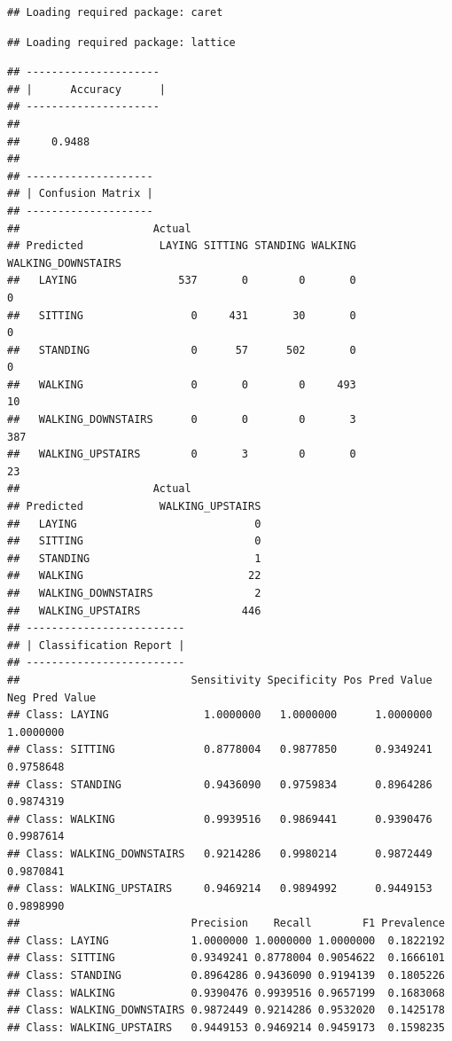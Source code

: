 \documentclass[
]{article}
\begin{document}
\begin{verbatim}
## Loading required package: caret
\end{verbatim}

\begin{verbatim}
## Loading required package: lattice
\end{verbatim}

\begin{verbatim}
## ---------------------
## |      Accuracy      |
## ---------------------
## 
##     0.9488
## 
## --------------------
## | Confusion Matrix |
## --------------------
##                     Actual
## Predicted            LAYING SITTING STANDING WALKING WALKING_DOWNSTAIRS
##   LAYING                537       0        0       0                  0
##   SITTING                 0     431       30       0                  0
##   STANDING                0      57      502       0                  0
##   WALKING                 0       0        0     493                 10
##   WALKING_DOWNSTAIRS      0       0        0       3                387
##   WALKING_UPSTAIRS        0       3        0       0                 23
##                     Actual
## Predicted            WALKING_UPSTAIRS
##   LAYING                            0
##   SITTING                           0
##   STANDING                          1
##   WALKING                          22
##   WALKING_DOWNSTAIRS                2
##   WALKING_UPSTAIRS                446
## -------------------------
## | Classification Report |
## -------------------------
##                           Sensitivity Specificity Pos Pred Value Neg Pred Value
## Class: LAYING               1.0000000   1.0000000      1.0000000      1.0000000
## Class: SITTING              0.8778004   0.9877850      0.9349241      0.9758648
## Class: STANDING             0.9436090   0.9759834      0.8964286      0.9874319
## Class: WALKING              0.9939516   0.9869441      0.9390476      0.9987614
## Class: WALKING_DOWNSTAIRS   0.9214286   0.9980214      0.9872449      0.9870841
## Class: WALKING_UPSTAIRS     0.9469214   0.9894992      0.9449153      0.9898990
##                           Precision    Recall        F1 Prevalence
## Class: LAYING             1.0000000 1.0000000 1.0000000  0.1822192
## Class: SITTING            0.9349241 0.8778004 0.9054622  0.1666101
## Class: STANDING           0.8964286 0.9436090 0.9194139  0.1805226
## Class: WALKING            0.9390476 0.9939516 0.9657199  0.1683068
## Class: WALKING_DOWNSTAIRS 0.9872449 0.9214286 0.9532020  0.1425178
## Class: WALKING_UPSTAIRS   0.9449153 0.9469214 0.9459173  0.1598235

\end{verbatim}
\end{document}
